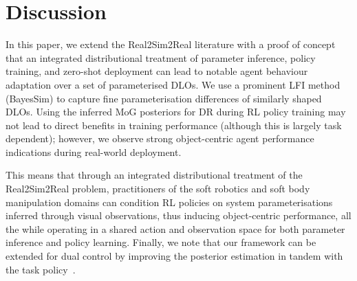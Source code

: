 \section{Discussion}
\label{sec:conclusions}

In this paper, we extend the Real2Sim2Real literature with a proof of concept that an integrated distributional treatment of parameter inference, policy training, and zero-shot deployment can lead to notable agent behaviour adaptation over a set of parameterised DLOs. 
We use a prominent LFI method (BayesSim) to capture fine parameterisation differences of similarly shaped DLOs. 
Using the inferred MoG posteriors for DR during RL policy training may not lead to direct benefits in training performance (although this is largely task dependent); however, we observe strong object-centric agent performance indications during real-world deployment.

This means that through an integrated distributional treatment of the Real2Sim2Real problem, practitioners of the soft robotics and soft body manipulation domains can condition RL policies on system parameterisations inferred through visual observations, thus inducing object-centric performance, all the while operating in a shared action and observation space for both parameter inference and policy learning.
Finally, we note that our framework can be extended for dual control by improving the posterior estimation in tandem with the task policy~\cite{possas2020online, barcelos2020disco}. 
